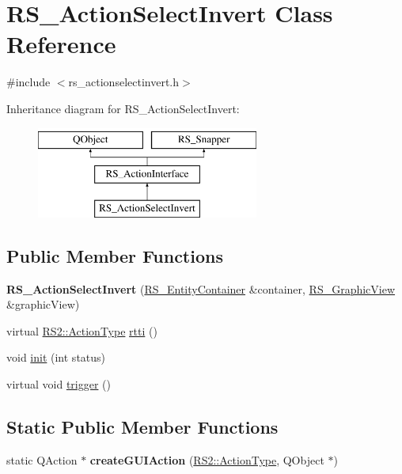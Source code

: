 \hypertarget{classRS__ActionSelectInvert}{\section{R\-S\-\_\-\-Action\-Select\-Invert Class Reference}
\label{classRS__ActionSelectInvert}
}


{\ttfamily \#include $<$rs\-\_\-actionselectinvert.\-h$>$}

Inheritance diagram for R\-S\-\_\-\-Action\-Select\-Invert\-:\begin{figure}[H]
\begin{center}
\leavevmode
\includegraphics[height=3.000000cm]{classRS__ActionSelectInvert}
\end{center}
\end{figure}
\subsection*{Public Member Functions}
\begin{DoxyCompactItemize}
\item 
\hypertarget{classRS__ActionSelectInvert_aab318c9fa98ea9f2912a31ba2b328e61}{{\bfseries R\-S\-\_\-\-Action\-Select\-Invert} (\hyperlink{classRS__EntityContainer}{R\-S\-\_\-\-Entity\-Container} \&container, \hyperlink{classRS__GraphicView}{R\-S\-\_\-\-Graphic\-View} \&graphic\-View)}\label{classRS__ActionSelectInvert_aab318c9fa98ea9f2912a31ba2b328e61}

\item 
virtual \hyperlink{classRS2_afe3523e0bc41fd637b892321cfc4b9d7}{R\-S2\-::\-Action\-Type} \hyperlink{classRS__ActionSelectInvert_a0dea281186eb740421260183525f72cb}{rtti} ()
\item 
void \hyperlink{classRS__ActionSelectInvert_a898e890105f3888d8649e3ff8a69a599}{init} (int status)
\item 
virtual void \hyperlink{classRS__ActionSelectInvert_a771a26a72176c9fcabc482174b62279f}{trigger} ()
\end{DoxyCompactItemize}
\subsection*{Static Public Member Functions}
\begin{DoxyCompactItemize}
\item 
\hypertarget{classRS__ActionSelectInvert_a1b71ae511597e6c05dbec519802a7aa9}{static Q\-Action $\ast$ {\bfseries create\-G\-U\-I\-Action} (\hyperlink{classRS2_afe3523e0bc41fd637b892321cfc4b9d7}{R\-S2\-::\-Action\-Type}, Q\-Object $\ast$)}\label{classRS__ActionSelectInvert_a1b71ae511597e6c05dbec519802a7aa9}

\end{DoxyCompactItemize}
